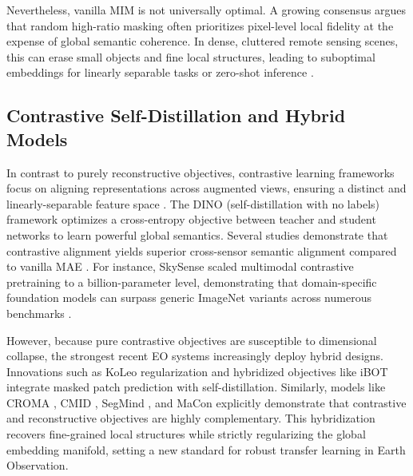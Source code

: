 Nevertheless, vanilla MIM is not universally optimal. A growing consensus argues that random high-ratio masking often prioritizes pixel-level local fidelity at the expense of global semantic coherence. In dense, cluttered remote sensing scenes, this can erase small objects and fine local structures, leading to suboptimal embeddings for linearly separable tasks or zero-shot inference \cite{nedungadi2024mmearth}.

\subsection{Contrastive Self-Distillation and Hybrid Models}
In contrast to purely reconstructive objectives, contrastive learning frameworks focus on aligning representations across augmented views, ensuring a distinct and linearly-separable feature space \cite{jain2022multimodal}. The DINO (self-distillation with no labels) framework \cite{caron2021emerging} optimizes a cross-entropy objective between teacher and student networks to learn powerful global semantics. Several studies demonstrate that contrastive alignment yields superior cross-sensor semantic alignment compared to vanilla MAE \cite{wolf2026brewing, guo2023skysense}. For instance, SkySense scaled multimodal contrastive pretraining to a billion-parameter level, demonstrating that domain-specific foundation models can surpass generic ImageNet variants across numerous benchmarks \cite{guo2023skysense}.

However, because pure contrastive objectives are susceptible to dimensional collapse, the strongest recent EO systems increasingly deploy hybrid designs. Innovations such as KoLeo regularization \cite{sablayrolles2021spreading} and hybridized objectives like iBOT \cite{zhou2021ibot} integrate masked patch prediction with self-distillation. Similarly, models like CROMA \cite{fuller2023croma}, CMID \cite{muhtar2023cmid}, SegMind \cite{li2023segmind}, and MaCon \cite{wang2025macon} explicitly demonstrate that contrastive and reconstructive objectives are highly complementary. This hybridization recovers fine-grained local structures while strictly regularizing the global embedding manifold, setting a new standard for robust transfer learning in Earth Observation.

